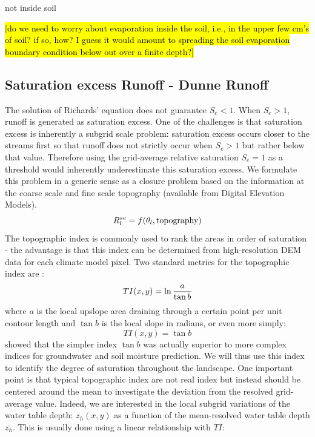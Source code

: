 \documentclass{report}
\begin{document}
not inside soil

\hl{[do we need to worry about evaporation inside the soil, i.e., in the upper few cm's of soil? if so, how? I guess it would amount to spreading the soil evaporation boundary condition below out over a finite depth?]}

\citep{Smits12a}

\subsection{Saturation excess Runoff - Dunne Runoff}

The solution of Richards' equation does not guarantee $S_e < 1$. When $S_e > 1$, runoff is generated as saturation excess. One of the challenges is that saturation excess is inherently a subgrid scale problem: saturation excess occurs closer to the streams first so that runoff does not strictly occur when $S_e > 1$ but rather below that value. Therefore using the grid-average relative saturation $S_e=1$ as a threshold would inherently underestimate this saturation excess. We formulate this problem in a generic sense as a closure problem based on the information at the coarse scale and fine scale topography (available from Digital Elevation Models). 
 \begin{equation}
    R_l^{se} = f(\theta_l,{\rm topography})
\end{equation}
The topographic index is commonly used to rank the areas in order of saturation - the advantage is that this index can be determined from high-resolution DEM data for each climate model pixel. Two standard metrics for the topographic index are \citep{Sorensen06, Beven79}: 
 \begin{equation}
    TI(x,y)=\ln {a \over \tan b}
\end{equation}
where $a$ is the local upslope area draining through a certain point per unit contour length and $\tan b$ is the local slope in radians,
or even more simply:
 \begin{equation}
    TI(x,y)=\tan b
\end{equation}
\citet{Sorensen06} showed that the simpler index $\tan b$ was actually superior to more complex indices for groundwater and soil moisture prediction. We will thus use this index to identify the degree of saturation throughout the landscape. One important point is that typical topographic index are not real index but instead should be centered around the mean to investigate the deviation from the resolved grid-average value. Indeed, we are interested in the local subgrid variations of the water table depth: $z_h(x,y)$ as a function of the mean-resolved water table depth $\overline{z_h}$. This is usually done using a linear relationship with $TI$:
\end{document}
